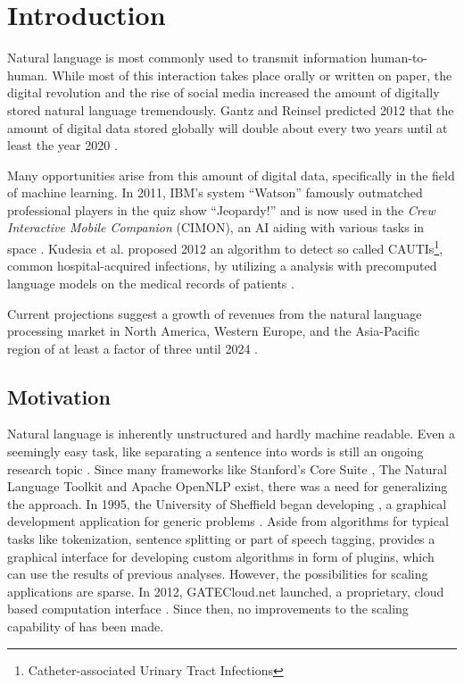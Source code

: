 
\chapter{Introduction}


Natural language is most commonly used to transmit information human-to-human. While most of this interaction takes place orally or written on paper, the digital revolution and the rise of social media increased the amount of digitally stored natural language tremendously. Gantz and Reinsel predicted 2012 that the amount of digital data stored globally will double about every two years until at least the year 2020 \cite{gantz2012digital}.

Many opportunities arise from this amount of digital data, specifically in the field of machine learning. In 2011, IBM's \qa{} system ``Watson'' famously outmatched professional players in the quiz show ``Jeopardy!'' \cite{ferrucci2012introduction,epstein2012making} and is now used in the \emph{Crew Interactive Mobile Companion} (CIMON), an AI aiding with various tasks in space \cite{cimon}. Kudesia et al. proposed 2012 an algorithm to detect so called CAUTIs\footnote{Catheter-associated Urinary Tract Infections}, common hospital-acquired infections, by utilizing a \nlp{} analysis with precomputed language models on the medical records of patients \cite{kudesia2012natural}.

Current projections suggest a growth of revenues from the natural language processing market in North America, Western Europe, and the Asia-Pacific region of at least a factor of three until 2024 \cite{stat:nlpeurope,stat:nlpamerica,stat:nlpasia}.

\section{Motivation}

Natural language is inherently unstructured and hardly machine readable. Even a seemingly easy task, like separating a sentence into words is still an ongoing research topic \cite{pak2018text}. Since many \nlp{} frameworks like Stanford's Core \nlp Suite \cite{manning-EtAl:2014:P14-5}, The Natural Language Toolkit \cite{bird2004nltk} and Apache OpenNLP \cite{opennlp} exist, there was a need for generalizing the \nlp{} approach. In 1995, the University of Sheffield began developing \nlpGate{}, a graphical development application for generic \nlp{} problems \cite{cunningham2002gate}. Aside from algorithms for typical \nlp{} tasks like tokenization, sentence splitting or part of speech tagging, \nlpGate{} provides a graphical interface for developing custom algorithms in form of plugins, which can use the results of previous \nlp{} analyses. However, the possibilities for scaling \nlpGate{} applications are sparse. In 2012, GATECloud.net launched, a proprietary, cloud based \nlpGate{} computation interface \cite{tablan2013gatecloud}. Since then, no improvements to the scaling capability of \nlpGate{} has been made. 

